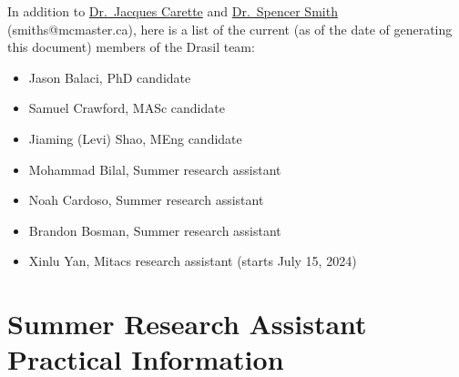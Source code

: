 \documentclass[12pt]{article}
\begin{document}
In addition to \href{https://www.cas.mcmaster.ca/~carette/} {Dr.\ Jacques
Carette} and \href{https://www.cas.mcmaster.ca/~smiths/} {Dr.\ Spencer Smith}
(smiths@mcmaster.ca), here is a list of the current (as of the date of
generating this document) members of the Drasil team:

\begin{itemize}
\item Jason Balaci, PhD candidate
\item Samuel Crawford, MASc candidate
\item Jiaming (Levi) Shao, MEng candidate
\item Mohammad Bilal, Summer research assistant
\item Noah Cardoso, Summer research assistant
\item Brandon Bosman, Summer research assistant
\item Xinlu Yan, Mitacs research assistant (starts July 15, 2024)
\end{itemize}

\section{Summer Research Assistant Practical Information} \label{SecPractInfo}
\end{document}
